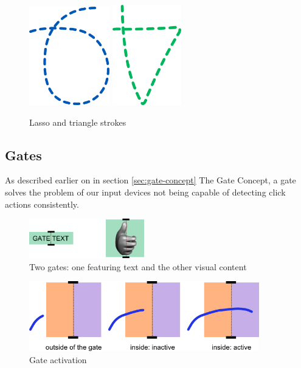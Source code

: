 \begin{figure}[!ht]
		\centering
		\includegraphics[width=3.5cm]{gfx/lasso.png}
		\qquad\qquad\qquad
		\includegraphics[width=3cm]{gfx/triangle.png}
		\caption{Lasso and triangle strokes}
		\label{fig:lasso-tri}
\end{figure}


\subsection{Gates}

As described earlier on in section \ref{sec:gate-concept} The Gate Concept,
a gate solves the problem of our input devices not being capable of detecting
click actions consistently.

\begin{figure}[!ht]
		\centering
		\includegraphics[width=5cm]{gfx/gate1e.png}
		\vspace{-0.5cm}
		\caption{Two gates: one featuring text and the other visual content}
		\label{fig:gate1}
\end{figure}

\begin{figure}[!ht]
		\vspace{-0.3cm}
		\centering
		\includegraphics[width=10cm]{gfx/gate2e.png}
		\vspace{-0.5cm}
		\caption{Gate activation}
		\label{fig:gate2}
\end{figure}

